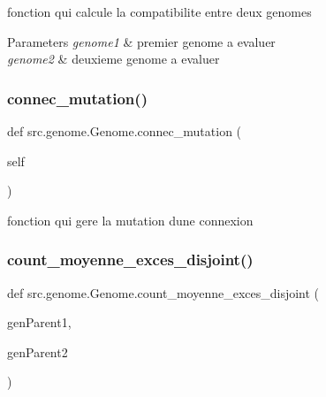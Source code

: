 fonction qui calcule la compatibilite entre deux genomes 


\begin{DoxyParams}{Parameters}
{\em genome1} & premier genome a evaluer \\
\hline
{\em genome2} & deuxieme genome a evaluer \\
\hline
\end{DoxyParams}
\mbox{\label{classsrc_1_1genome_1_1_genome_a9ead2052440838c9ae62fb4941307dca}} 
\subsubsection{\texorpdfstring{connec\+\_\+mutation()}{connec\_mutation()}}
{\footnotesize\ttfamily def src.\+genome.\+Genome.\+connec\+\_\+mutation (\begin{DoxyParamCaption}\item[{}]{self }\end{DoxyParamCaption})}



fonction qui gere la mutation d\textquotesingle{}une connexion 

\mbox{\label{classsrc_1_1genome_1_1_genome_aa5ef9dec09b2a88c68a7bd2f92dce8b1}} 
\subsubsection{\texorpdfstring{count\+\_\+moyenne\+\_\+exces\+\_\+disjoint()}{count\_moyenne\_exces\_disjoint()}}
{\footnotesize\ttfamily def src.\+genome.\+Genome.\+count\+\_\+moyenne\+\_\+exces\+\_\+disjoint (\begin{DoxyParamCaption}\item[{}]{gen\+Parent1,  }\item[{}]{gen\+Parent2 }\end{DoxyParamCaption})\hspace{0.3cm}{\ttfamily [static]}}



